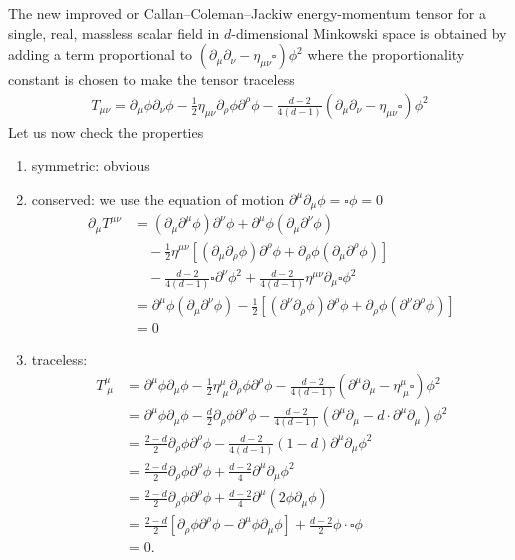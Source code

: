 \documentclass[10pt,a4paper]{article}
\theoremstyle{definition}
\begin{document}
The new improved or Callan–Coleman–Jackiw energy-momentum tensor for a single, real, massless scalar field in $d$-dimensional Minkowski space is obtained by adding a term proportional to $(\partial_\mu\partial_\nu-\eta_{\mu\nu}\square)\phi^2$ where the proportionality constant is chosen to make the tensor traceless
\begin{align}
    T_{\mu\nu}=\partial_\mu\phi\partial_\nu\phi-\frac{1}{2}\eta_{\mu\nu}\partial_\rho\phi\partial^\rho\phi-\frac{d-2}{4(d-1)}\left(\partial_\mu\partial_\nu-\eta_{\mu\nu}\square\right)\phi^2
\end{align}
Let us now check the properties
\begin{enumerate}
    \item symmetric: obvious
    \item conserved: we use the equation of motion $\partial^\mu\partial_\mu\phi=\square\phi=0$
    \begin{align}
        \partial_\mu T^{\mu\nu}&=(\partial_\mu\partial^\mu\phi)\partial^\nu\phi+\partial^\mu\phi(\partial_\mu\partial^\nu\phi)\\
        &\quad-\frac{1}{2}\eta^{\mu\nu}\left[(\partial_\mu\partial_\rho\phi)\partial^\rho\phi + \partial_\rho\phi(\partial_\mu\partial^\rho\phi)\right]\\
        &\quad-\frac{d-2}{4(d-1)}\square\partial^\nu\phi^2+\frac{d-2}{4(d-1)}\eta^{\mu\nu}\partial_\mu\square\phi^2\\
        &=\partial^\mu\phi(\partial_\mu\partial^\nu\phi)-\frac{1}{2}\left[(\partial^\nu\partial_\rho\phi)\partial^\rho\phi + \partial_\rho\phi(\partial^\nu\partial^\rho\phi)\right]\\
        &=0
    \end{align}
    \item traceless: 
    \begin{align}
    T^\mu_{\;\mu}&=\partial^\mu\phi\partial_\mu\phi-\frac{1}{2}\eta^\mu_{\;\mu}\partial_\rho\phi\partial^\rho\phi-\frac{d-2}{4(d-1)}\left(\partial^\mu\partial_\mu-\eta^\mu_{\;\mu}\square\right)\phi^2\\
    &=\partial^\mu\phi\partial_\mu\phi-\frac{d}{2}\partial_\rho\phi\partial^\rho\phi-\frac{d-2}{4(d-1)}\left(\partial^\mu\partial_\mu-d\cdot\partial^\mu\partial_\mu\right)\phi^2\\
    &=\frac{2-d}{2}\partial_\rho\phi\partial^\rho\phi-\frac{d-2}{4(d-1)}(1-d)\partial^\mu\partial_\mu\phi^2\\
    &=\frac{2-d}{2}\partial_\rho\phi\partial^\rho\phi+\frac{d-2}{4}\partial^\mu\partial_\mu\phi^2\\
    &=\frac{2-d}{2}\partial_\rho\phi\partial^\rho\phi+\frac{d-2}{4}\partial^\mu(2\phi\partial_\mu\phi)\\
    &=\frac{2-d}{2}[\partial_\rho\phi\partial^\rho\phi-\partial^\mu\phi\partial_\mu\phi]+\frac{d-2}{2}\phi\cdot\square\phi\\
    &=0.
\end{align}
\end{enumerate}
\end{document}
